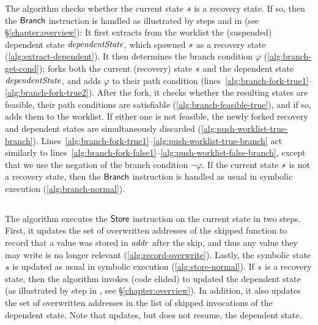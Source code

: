 The algorithm checks whether the current state $s$ is a
recovery state. If so, then the $\mathsf{Branch}$ instruction is
handled as illustrated by steps  and  in
 (see \S\ref{chapter:overview}): It first extracts from
the worklist the (suspended) dependent state $\mathit{dependentState}$, which
spawned $s$ as a recovery state
(\cref{alg:extract-dependent}).  It then determines the branch
condition $\varphi$ (\cref{alg:branch-get-cond}); forks both the
current (recovery) state $s$ and the dependent state
$\mathit{dependentState}$, and adds $\varphi$ to their path condition
(lines~\ref{alg:branch-fork-true1}--\ref{alg:branch-fork-true2}).
After the fork, it checks whether the resulting states are feasible,
\ie their path conditions are satisfiable
(\cref{alg:branch-feasible-true}), and if so, adds them to the
worklist. If either one is not feasible, the newly forked recovery and
dependent states are simultaneously discarded
(\cref{alg:push-worklist-true-branch}).
Lines~\ref{alg:branch-fork-true1}--\ref{alg:push-worklist-true-branch}
act similarly to
lines~\ref{alg:branch-fork-false1}--\ref{alg:push-worklist-false-branch},
except that we use the negation of the branch condition
$\neg\varphi$. If the current state $s$ is not a recovery
state, then the $\mathsf{Branch}$ instruction is handled as usual in
symbolic execution (\cref{alg:branch-normal}).

\subsection{}

The algorithm executes the $\mathsf{Store}$ instruction on the
current state in two steps. First, it updates the set of overwritten
addresses of the skipped function to record that a value was stored in
$\mathit{addr}$ after the skip, and thus any value they may write is no longer
relevant (\cref{alg:record-overwrite}). Lastly, the symbolic state
$s$ is updated as usual in symbolic execution
(\cref{alg:store-normal}). If $s$ is a recovery state, then
the algorithm invokes
 (code elided) to
updated the dependent state (as illustrated by step  in
, see \S\ref{chapter:overview}). In addition, it also
updates the set of overwritten addresses in the list of skipped
invocations of the dependent state. Note that
 updates, but
does not resume, the dependent state.

